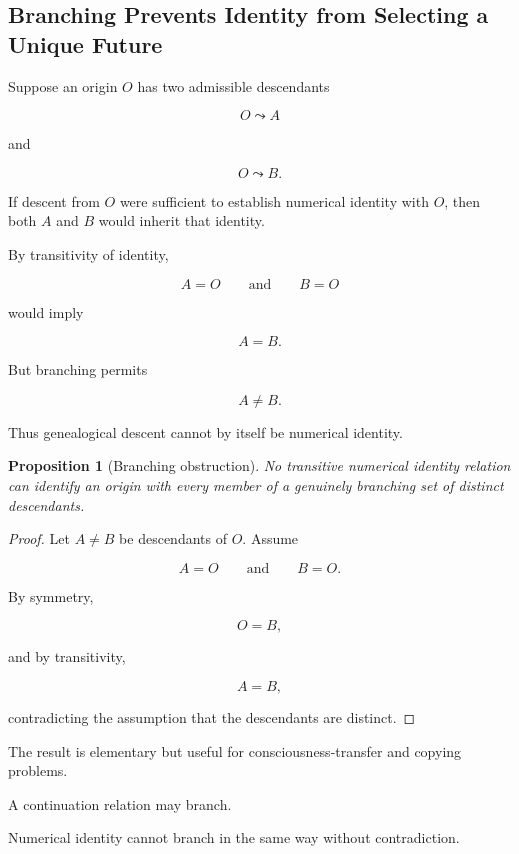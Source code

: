 \documentclass[
  11pt,
  a4paper,
  DIV=12,
  BCOR=0mm,
  parskip=half-
]{scrartcl}
\theoremstyle{definition}
\theoremstyle{plain}
\newtheorem{proposition}[definition]{Proposition}
\theoremstyle{remark}
\begin{document}
\subsection{Branching Prevents Identity from Selecting a Unique Future}
\label{app:branching-identity}

Suppose an origin \(O\) has two admissible descendants

\[
  O\leadsto A
\]

and

\[
  O\leadsto B.
\]

If descent from \(O\) were sufficient to establish numerical identity with
\(O\), then both \(A\) and \(B\) would inherit that identity.

By transitivity of identity,

\[
  A=O
  \qquad\text{and}\qquad
  B=O
\]

would imply

\[
  A=B.
\]

But branching permits

\[
  A\neq B.
\]

Thus genealogical descent cannot by itself be numerical identity.

\begin{proposition}[Branching obstruction]
\label{prop:branching-obstruction}
No transitive numerical identity relation can identify an origin with every
member of a genuinely branching set of distinct descendants.
\end{proposition}

\begin{proof}
Let \(A\neq B\) be descendants of \(O\). Assume

\[
  A=O
  \qquad\text{and}\qquad
  B=O.
\]

By symmetry,

\[
  O=B,
\]

and by transitivity,

\[
  A=B,
\]

contradicting the assumption that the descendants are distinct.
\end{proof}

The result is elementary but useful for consciousness-transfer and copying
problems.

A continuation relation may branch.

Numerical identity cannot branch in the same way without contradiction.

\end{document}
